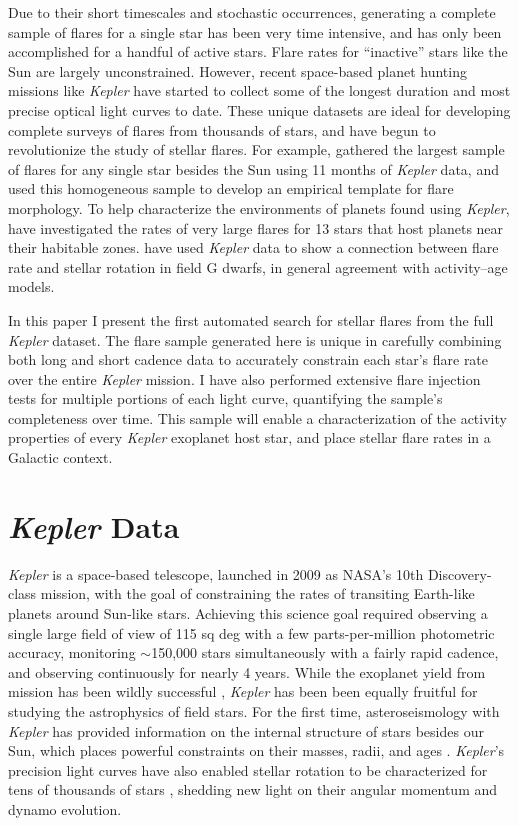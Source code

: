 \documentclass[twocolumn]{aastex6}
\newcommand{\Kepler}{\textsl{Kepler}\xspace}
\begin{document}
Due to their short timescales and stochastic occurrences, generating a complete sample of flares for a single star has been very time intensive, and has only been accomplished for a handful of active stars. Flare rates for ``inactive'' stars like the Sun are largely unconstrained. However, recent space-based planet hunting missions like \Kepler \citep{borucki2010} have started to collect some of the longest duration and most precise optical light curves to date. These unique datasets are ideal for developing complete surveys of flares from thousands of stars, and have begun to revolutionize the study of stellar flares. For example, \citet{davenport2014b} gathered the largest sample of flares for any single star besides the Sun using 11 months of \Kepler data, and used this homogeneous sample to develop an empirical template for flare morphology. To help characterize the environments of planets found using \Kepler, \citet{armstrong2016} have investigated the rates of very large flares for 13 stars that host planets near their habitable zones. \citet{maehara2012} have used \Kepler data to show a connection between flare rate and stellar rotation in field G dwarfs, in general agreement with activity--age models.


In this paper I present the first automated search for stellar flares from the full \Kepler dataset. The flare sample generated here is unique in carefully combining both long and short cadence data to accurately constrain each star's flare rate over the entire \Kepler mission. I have also performed extensive flare injection tests for multiple portions of each light curve, quantifying the sample's completeness over time. This sample will enable a characterization of the activity properties of every \Kepler exoplanet host star, and place stellar flare rates in a Galactic context.


\section{{\it Kepler} Data}
\label{sec:data}

\Kepler is a space-based telescope, launched in 2009 as NASA's 10th Discovery-class mission, with the goal of constraining the rates of transiting Earth-like planets around Sun-like stars. Achieving this science goal required observing a single large field of view of 115 sq deg with a few parts-per-million photometric accuracy, monitoring $\sim$150,000 stars simultaneously with a fairly rapid cadence, and observing continuously for nearly 4 years. While the exoplanet yield from mission has been wildly successful \citep[e.g.][]{jenkins2015}, \Kepler has been been equally fruitful for studying the astrophysics of field stars. For the first time, asteroseismology with \Kepler has provided information on the internal structure of stars besides our Sun, which places powerful constraints on their masses, radii, and ages \citep{chaplin2010,chaplin2013}. \Kepler's precision light curves have also enabled stellar rotation to be characterized for tens of thousands of stars \citep{reinhold2013,mcquillan2014}, shedding new light on their angular momentum and dynamo evolution.
\end{document}
